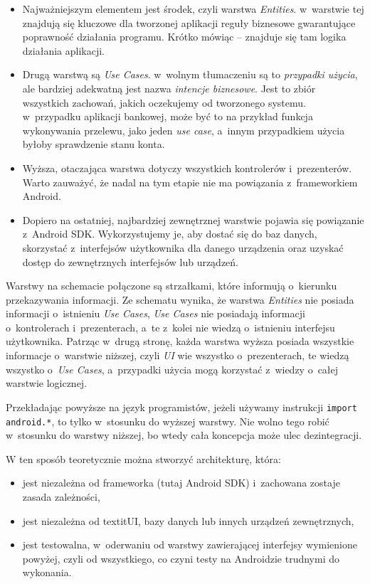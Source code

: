 \begin{itemize}

\item
Najważniejszym elementem jest środek, czyli warstwa \textit{Entities}. w~warstwie tej znajdują się kluczowe dla tworzonej aplikacji reguły biznesowe gwarantujące poprawność działania programu. Krótko mówiąc – znajduje się tam logika działania aplikacji.
\item
Drugą warstwą są \textit{Use Cases}. w~wolnym tłumaczeniu są to \textit{przypadki użycia}, ale bardziej adekwatną jest nazwa \textit{intencje biznesowe}. Jest to zbiór wszystkich zachowań, jakich oczekujemy od tworzonego systemu. w~przypadku aplikacji bankowej, może być to na przykład funkcja wykonywania przelewu, jako jeden \textit{use case}, a~innym przypadkiem użycia byłoby sprawdzenie stanu konta.
\item
Wyższa, otaczająca warstwa dotyczy wszystkich kontrolerów i~prezenterów. Warto zauważyć, że nadal na tym etapie nie ma powiązania z~frameworkiem Android.
\item
Dopiero na ostatniej, najbardziej zewnętrznej warstwie pojawia się powiązanie z~Android SDK. Wykorzystujemy je, aby dostać się do baz danych, skorzystać z~interfejsów użytkownika dla danego urządzenia oraz uzyskać dostęp do zewnętrznych interfejsów lub urządzeń.
\end{itemize}

Warstwy na schemacie połączone są strzałkami, które informują o~kierunku przekazywania informacji. Ze schematu wynika, że warstwa \textit{Entities} nie posiada informacji o~istnieniu \textit{Use Cases}, \textit{Use Cases} nie posiadają informacji o~kontrolerach i~prezenterach, a~te z~kolei nie wiedzą o~istnieniu interfejsu użytkownika. Patrząc w~drugą stronę, każda warstwa wyższa posiada wszystkie informacje o~warstwie niższej, czyli \textit{UI} wie wszystko o~prezenterach, te wiedzą wszystko o~\textit{Use Cases}, a~przypadki użycia mogą korzystać z~wiedzy o~całej warstwie logicznej.

Przekładając powyższe na język programistów, jeżeli używamy instrukcji \texttt{import android.*}, to tylko w~stosunku do wyższej warstwy. Nie wolno tego robić w~stosunku do warstwy niższej, bo wtedy cała koncepcja może ulec dezintegracji.

W ten sposób teoretycznie można stworzyć architekturę, która:
\begin{itemize}
\item
jest niezależna od frameworka (tutaj Android SDK) i~zachowana zostaje zasada zależności,
\item
jest niezależna od textit{UI}, bazy danych lub innych urządzeń zewnętrznych,
\item
jest testowalna, w~oderwaniu od warstwy zawierającej interfejsy wymienione powyżej, czyli od wszystkiego, co czyni testy na Androidzie trudnymi do wykonania.
\end{itemize}

